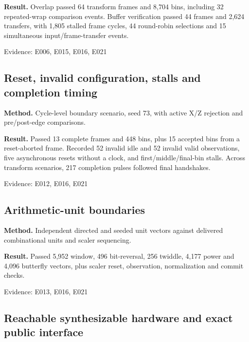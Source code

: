 \documentclass[11pt,a4paper]{article}
\begin{document}
\textbf{Result.} Overlap passed 64 transform frames and 8,\allowbreak{}704 bins,\allowbreak{} including 32 repeated-wrap comparison events. Buffer verification passed 44 frames and 2,\allowbreak{}624 transfers,\allowbreak{} with 1,\allowbreak{}805 stalled frame cycles,\allowbreak{} 44 round-robin selections and 15 simultaneous input/\allowbreak{}frame-transfer events.

{\small Evidence: E006,\allowbreak{} E015,\allowbreak{} E016,\allowbreak{} E021}

\subsection{Reset,\allowbreak{} invalid configuration,\allowbreak{} stalls and completion timing}

\textbf{Method.} Cycle-level boundary scenario,\allowbreak{} seed 73,\allowbreak{} with active X/\allowbreak{}Z rejection and pre/\allowbreak{}post-edge comparisons.

\textbf{Result.} Passed 13 complete frames and 448 bins,\allowbreak{} plus 15 accepted bins from a reset-aborted frame. Recorded 52 invalid idle and 52 invalid valid observations,\allowbreak{} five asynchronous resets without a clock,\allowbreak{} and first/\allowbreak{}middle/\allowbreak{}final-bin stalls. Across transform scenarios,\allowbreak{} 217 completion pulses followed final handshakes.

{\small Evidence: E012,\allowbreak{} E016,\allowbreak{} E021}

\subsection{Arithmetic-unit boundaries}

\textbf{Method.} Independent directed and seeded unit vectors against delivered combinational units and scaler sequencing.

\textbf{Result.} Passed 5,\allowbreak{}952 window,\allowbreak{} 496 bit-reversal,\allowbreak{} 256 twiddle,\allowbreak{} 4,\allowbreak{}177 power and 4,\allowbreak{}096 butterfly vectors,\allowbreak{} plus scaler reset,\allowbreak{} observation,\allowbreak{} normalization and commit checks.

{\small Evidence: E013,\allowbreak{} E016,\allowbreak{} E021}

\subsection{Reachable synthesizable hardware and exact public interface}
\end{document}
